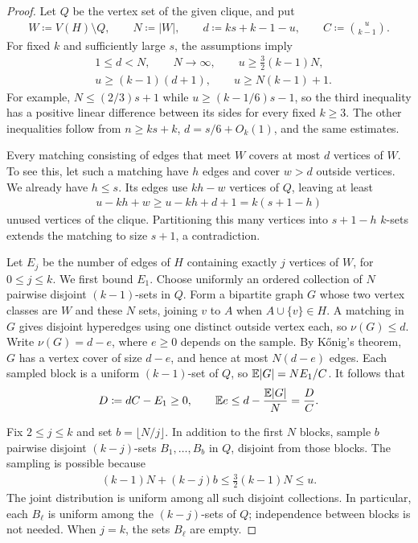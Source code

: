 \begin{proof}
Let $Q$ be the vertex set of the given clique, and put
\begin{align*}
W\coloneqq V(H)\setminus Q,\qquad
N\coloneqq|W|,\qquad
d\coloneqq ks+k-1-u,\qquad
C\coloneqq\binom{u}{k-1}.
\end{align*}
For fixed $k$ and sufficiently large $s$, the assumptions imply
\begin{align}
&1\le d<N,\qquad N\to\infty,\qquad u\ge\frac32(k-1)N,\nonumber\\
&u\ge(k-1)(d+1),\qquad u\ge N(k-1)+1.
\label{eq:clique-size-conditions}
\end{align}
For example, $N\le(2/3)s+1$ while $u\ge(k-1/6)s-1$, so the third inequality has a positive linear difference between its sides for every fixed $k\ge3$. The other inequalities follow from $n\ge ks+k$, $d=s/6+O_k(1)$, and the same estimates.

Every matching consisting of edges that meet $W$ covers at most $d$ vertices of $W$. To see this, let such a matching have $h$ edges and cover $w>d$ outside vertices. We already have $h\le s$. Its edges use $kh-w$ vertices of $Q$, leaving at least
\begin{align*}
u-kh+w\ge u-kh+d+1=k(s+1-h)
\end{align*}
unused vertices of the clique. Partitioning this many vertices into $s+1-h$ $k$-sets extends the matching to size $s+1$, a contradiction.

Let $E_j$ be the number of edges of $H$ containing exactly $j$ vertices of $W$, for $0\le j\le k$. We first bound $E_1$. Choose uniformly an ordered collection of $N$ pairwise disjoint $(k-1)$-sets in $Q$. Form a bipartite graph $G$ whose two vertex classes are $W$ and these $N$ sets, joining $v$ to $A$ when $A\cup\{v\}\in H$. A matching in $G$ gives disjoint hyperedges using one distinct outside vertex each, so $\nu(G)\le d$. Write $\nu(G)=d-e$, where $e\ge0$ depends on the sample. By K\H{o}nig's theorem, $G$ has a vertex cover of size $d-e$, and hence at most $N(d-e)$ edges. Each sampled block is a uniform $(k-1)$-set of $Q$, so $\mathbb E|G|=NE_1/C$. It follows that
\begin{align}
D\coloneqq dC-E_1\ge0,\qquad
\mathbb E e\le d-\frac{\mathbb E|G|}{N}=\frac DC.
\label{eq:singleton-deficit}
\end{align}

Fix $2\le j\le k$ and set $b=\lfloor N/j\rfloor$. In addition to the first $N$ blocks, sample $b$ pairwise disjoint $(k-j)$-sets $B_1,\ldots,B_b$ in $Q$, disjoint from those blocks. The sampling is possible because
\begin{align*}
(k-1)N+(k-j)b\le\tfrac32(k-1)N\le u.
\end{align*}
The joint distribution is uniform among all such disjoint collections. In particular, each $B_\ell$ is uniform among the $(k-j)$-sets of $Q$; independence between blocks is not needed. When $j=k$, the sets $B_\ell$ are empty.


\end{proof}
